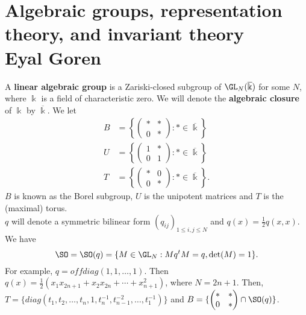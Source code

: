 \chapter{Algebraic groups, representation theory, and invariant theory \\ Eyal Goren}\label{ch:2}

A \textbf{linear algebraic group} is a Zariski-closed subgroup of $\GL_{N}(\overline{\Bbbk})$ for some $N$, where $\Bbbk$ is a field of characteristic zero.  We will denote the \textbf{algebraic closure} of $\Bbbk$ by $\overline{\Bbbk}$.  We let
\begin{align*}
B &= \left\{\begin{pmatrix} \ast & \ast \\ 0 & \ast\end{pmatrix}: \ast \in \overline{\Bbbk}\right\} \\
U &= \left\{\begin{pmatrix} 1 & \ast \\ 0 & 1\end{pmatrix}: \ast \in \overline{\Bbbk}\right\} \\
T &= \left\{\begin{pmatrix} \ast & 0 \\ 0 & \ast\end{pmatrix}: \ast \in \overline{\Bbbk}\right\}.
\end{align*}
$B$ is known as the Borel subgroup, $U$ is the unipotent matrices and $T$ is the (maximal) torus.\\
$q$ will denote a symmetric bilinear form $(q_{ij})_{1 \le i,j \le N}$ and $q(x)=\frac{1}{2}q(x,x)$.  We have
\begin{equation*}
\SO=\SO(q)=\{M \in \GL_{N}: Mq^{t}M=q, \det(M)=1\}.
\end{equation*}
For example, $q=offdiag(1,1,\dotsc,1)$.  Then $q(x)=\frac{1}{2}(x_{1}x_{2n+1}+x_{2}x_{2n}+\dotsb+x_{n+1}^{2})$, where $N=2n+1$.  Then, $T=\{ diag(t_{1},t_{2},\dotsc, t_{n},1,t_{n}^{-1},t_{n-1}^{-2},\dotsc,t_{1}^{-1})\}$ and $B=\{\begin{pmatrix} \ast & \ast \\ 0 & \ast\end{pmatrix} \cap \SO(q)\}$.